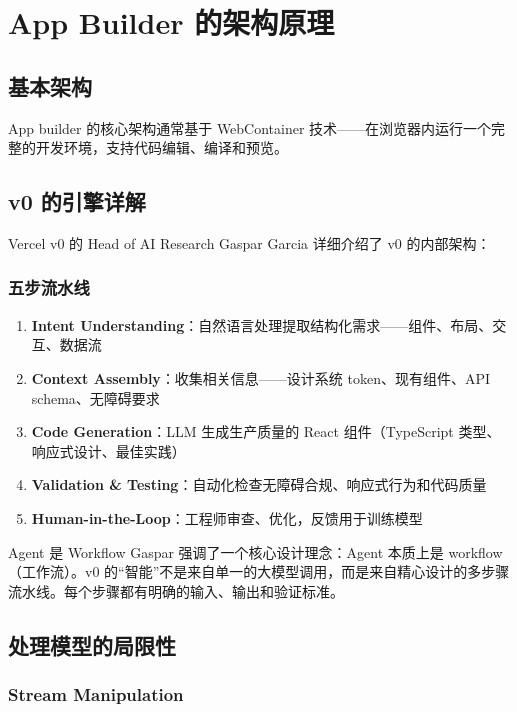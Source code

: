 \documentclass[a4paper]{article}
\begin{document}
\section{App Builder 的架构原理}

\subsection{基本架构}

App builder 的核心架构通常基于 WebContainer 技术——在浏览器内运行一个完整的开发环境，支持代码编辑、编译和预览。

\subsection{v0 的引擎详解}

Vercel v0 的 Head of AI Research Gaspar Garcia 详细介绍了 v0 的内部架构：

\subsubsection{五步流水线}

\begin{enumerate}
    \item \textbf{Intent Understanding}：自然语言处理提取结构化需求——组件、布局、交互、数据流
    \item \textbf{Context Assembly}：收集相关信息——设计系统 token、现有组件、API schema、无障碍要求
    \item \textbf{Code Generation}：LLM 生成生产质量的 React 组件（TypeScript 类型、响应式设计、最佳实践）
    \item \textbf{Validation \& Testing}：自动化检查无障碍合规、响应式行为和代码质量
    \item \textbf{Human-in-the-Loop}：工程师审查、优化，反馈用于训练模型
\end{enumerate}

\begin{importantbox}{Agent 是 Workflow}
Gaspar 强调了一个核心设计理念：Agent 本质上是 workflow（工作流）。v0 的``智能''不是来自单一的大模型调用，而是来自精心设计的多步骤流水线。每个步骤都有明确的输入、输出和验证标准。
\end{importantbox}

\subsection{处理模型的局限性}

\subsubsection{Stream Manipulation}
\end{document}
